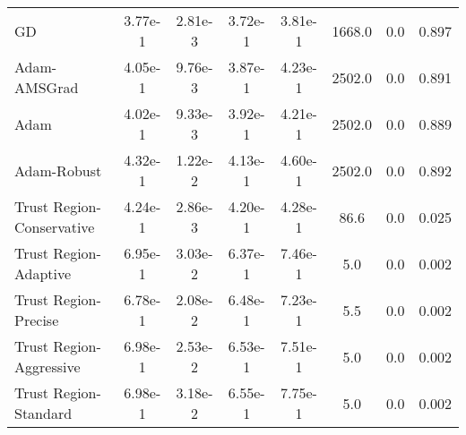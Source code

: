 \documentclass{article}
\begin{document}
\begin{table}[htbp]
{\begin{tabular}{p{2.5cm}*{7}{c}}
GD & 3.77e-1 & 2.81e-3 & 3.72e-1 & 3.81e-1 & 1668.0 & 0.0 & 0.897 \\
Adam-AMSGrad & 4.05e-1 & 9.76e-3 & 3.87e-1 & 4.23e-1 & 2502.0 & 0.0 & 0.891 \\
Adam & 4.02e-1 & 9.33e-3 & 3.92e-1 & 4.21e-1 & 2502.0 & 0.0 & 0.889 \\
Adam-Robust & 4.32e-1 & 1.22e-2 & 4.13e-1 & 4.60e-1 & 2502.0 & 0.0 & 0.892 \\
Trust Region-Conservative & 4.24e-1 & 2.86e-3 & 4.20e-1 & 4.28e-1 & 86.6 & 0.0 & 0.025 \\
Trust Region-Adaptive & 6.95e-1 & 3.03e-2 & 6.37e-1 & 7.46e-1 & 5.0 & 0.0 & 0.002 \\
Trust Region-Precise & 6.78e-1 & 2.08e-2 & 6.48e-1 & 7.23e-1 & 5.5 & 0.0 & 0.002 \\
Trust Region-Aggressive & 6.98e-1 & 2.53e-2 & 6.53e-1 & 7.51e-1 & 5.0 & 0.0 & 0.002 \\
Trust Region-Standard & 6.98e-1 & 3.18e-2 & 6.55e-1 & 7.75e-1 & 5.0 & 0.0 & 0.002 \\
\bottomrule
\end{tabular}
}
\end{table}
\end{document}
